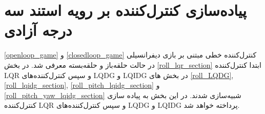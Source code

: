 \chapter{پیاده‌سازی کنترل‌کننده بر رویه استند سه درجه آزادی}
\ref{openloop_game}
و
\ref{closedloop_game}
کنترل‌کننده خطی مبتنی بر بازی دیفرانسیلی در حالت حلقه‌باز و حلقه‌بسته معرفی شد. در بخش
\ref{roll_lqr_section}
ابتدا کنترل‌کننده LQR و سپس کنترل‌کننده‌های LQDG و LQIDG در بخش های
\ref{roll_LQDG},
\ref{roll_lqidg_section},
\ref{roll_pitch_lqidg_section}
و
\ref{roll_pitch_yaw_lqidg_section}
شبیه‌سازی شدند.
در این بخش به پیاده سازی کنترل‌کننده LQR و سپس کنترل‌کننده‌های LQDG و LQIDG پرداخته خواهد شد.

